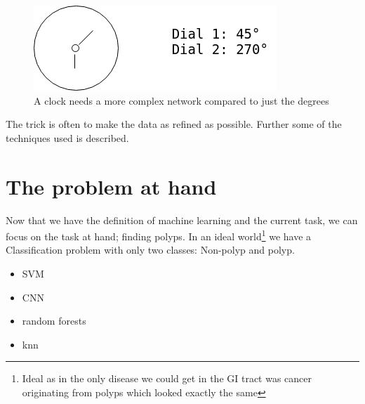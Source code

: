 	\begin{figure}[ht]
	  \centering
	  \includegraphics[scale=0.5]{methods/figures/Clock.png}
	  \caption{A clock needs a more complex network compared to just the degrees}
	\end{figure}
	The trick is often to make the data as refined as possible. 
	Further some of the techniques used is described.
	
	
	
	  
	  
\section{The problem at hand}
	  Now that we have the definition of machine learning and the current task, we can focus on the task at hand; finding polyps. In an ideal world\footnote{Ideal as in the only disease we could get in  the GI tract was cancer originating
	  from polyps which looked exactly the same} we have a
	  Classification problem with only two classes: Non-polyp and polyp. 
	  
	  \begin{itemize}
	    \item SVM 
	    \item CNN 
	    \item random forests
	    \item knn
	  \end{itemize}
	  
	
	